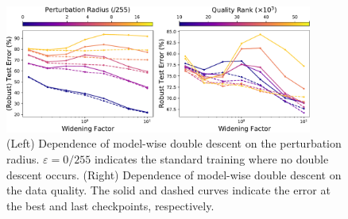 \begin{figure}[!ht]
  \centering
  \includegraphics[width=0.9\textwidth]{figures/dependence-model-wise-perturbation-quality.pdf}
  \caption{(Left) Dependence of model-wise double descent on the perturbation radius. 
  $\varepsilon = 0/255$ indicates the standard training where no double descent occurs. 
  (Right) Dependence of model-wise double descent on the data quality. The solid and dashed curves indicate the error at the best and last checkpoints, respectively.
  }
\label{fig:dependence-model-wise-perturbation-quality}
\end{figure}





